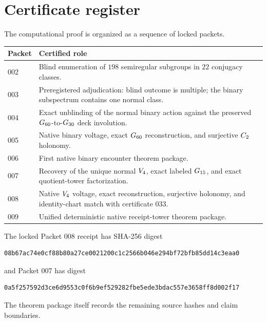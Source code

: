 \section{Certificate register}

The computational proof is organized as a sequence of locked packets.

\begin{longtable}{p{}p{}}
\toprule
Packet & Certified role\\
\midrule
\endhead
002 & Blind enumeration of \(198\) semiregular subgroups in \(22\)
conjugacy classes.\\
003 & Preregistered adjudication: blind outcome is multiple; the binary
subspectrum contains one normal class.\\
004 & Exact unblinding of the normal binary action against the preserved
\(G_{60}\)-to-\(G_{30}\) deck involution.\\
005 & Native binary voltage, exact \(G_{60}\) reconstruction, and
surjective \(C_{2}\) holonomy.\\
006 & First native binary encounter theorem package.\\
007 & Recovery of the unique normal \(V_{4}\), exact labeled
\(G_{15}\), and exact quotient-tower factorization.\\
008 & Native \(V_{4}\) voltage, exact reconstruction, surjective
holonomy, and identity-chart match with certificate 033.\\
009 & Unified deterministic native receipt-tower theorem package.\\
\bottomrule
\end{longtable}

The locked Packet 008 receipt has SHA-256 digest
\begin{verbatim}
08b67ac74e0cf88b80a27ce0021200c1c2566b046e294bf72bfb85dd14c3eaa0
\end{verbatim}
and Packet 007 has digest
\begin{verbatim}
0a5f257592d3ce6d9553c0f6b9ef529282fbe5ede3bdac557e3658ff8d002f17
\end{verbatim}
The theorem package itself records the remaining source hashes and
claim boundaries.
